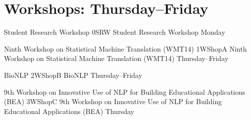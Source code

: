 \vspace*{-3cm}\par
\chapter{Workshops: Thursday--Friday}
\thispagestyle{emptyheader}




\begin{wsschedule}
  {Student Research Workshop}
  {0}{SRW}
  {Student Research Workshop}
  {Monday}
  {\SRWLoc}
  
\end{wsschedule}

\clearpage
{}

\begin{wsschedule}
  {Ninth Workshop on Statistical Machine Translation (WMT14)}
  {1}{WShopA}
  {Ninth Workshop on Statistical Machine Translation (WMT14)}
  {Thursday--Friday}
  {\WShopLocA}
  
\end{wsschedule}
        
\begin{wsschedule}
  {BioNLP}
  {2}{WShopB}
  {BioNLP}
  {Thursday--Friday}
  {\WShopLocB}
  
\end{wsschedule}



\begin{wsschedule}
  {9th Workshop on Innovative Use of NLP for Building Educational Applications (BEA)}
  {3}{WShopC}
  {9th Workshop on Innovative Use of NLP for Building Educational Applications (BEA)}
  {Thursday}
  {\WShopLocC}
  \clearpage
\end{wsschedule}

